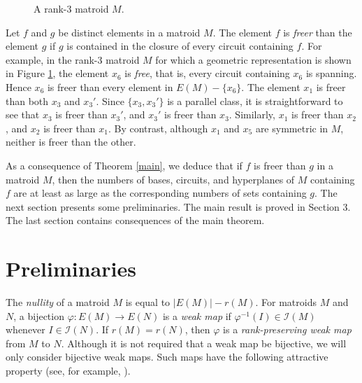 \documentclass[12pt,reqno]{amsart}
\theoremstyle{definition}
\theoremstyle{remark}
\numberwithin{equation}{section}
\newcommand{\I}{\mathcal{I}}
\begin{document}
\begin{figure}
    \centering
\caption{A rank-3 matroid $M$.}\label{qsix}
\end{figure}
Let $f$ and $g$ be distinct elements in a matroid $M$. The element $f$ is \textit{freer} than the element $g$ if $g$ is contained in the closure of every circuit containing $f$. For example, in the rank-3 matroid $M$ for which a geometric representation is shown in Figure \ref{qsix}, the element $x_6$ is \textit{free}, that is, every circuit containing $x_6$ is spanning. Hence $x_6$ is freer than every element in $E(M)-\{x_6\}$. The element $x_1$ is freer than both $x_3$ and $x_3'$. Since $\{x_3,x_3'\}$ is a parallel class, it is straightforward to see that $x_3$ is freer than $x_3'$, and $x_3'$ is freer than $x_3$. Similarly, $x_1$ is freer than $x_2$, and $x_2$ is freer than $x_1$. By contrast, although $x_1$ and $x_5$ are symmetric in $M$, neither is freer than the other.

As a consequence of Theorem \ref{main}, we deduce that if $f$ is freer than $g$ in a matroid $M$, then the numbers of bases, circuits, and hyperplanes of $M$ containing $f$ are at least as large as the corresponding numbers of sets containing $g$. 
The next section presents some preliminaries. 
The main result is proved in Section 3.
The last section contains consequences of the main theorem. 

\section{Preliminaries}
The \textit{nullity} of a matroid $M$ is equal to $|E(M)|-r(M)$. 
For matroids $M$ and $N$, a bijection $\varphi:E(M) \to E(N)$ is a \textit{weak map} if $\varphi^{-1}(I)\in \I(M)$ whenever $I \in \I(N)$.
If $r(M)=r(N)$, then $\varphi$ is a \textit{rank-preserving weak map} from $M$ to $N$.
Although it is not required that a weak map be bijective, we will only consider bijective weak maps. 
Such maps have the following attractive property (see, for example, \cite[Corollary~7.3.13]{ox}).     
\end{document}
